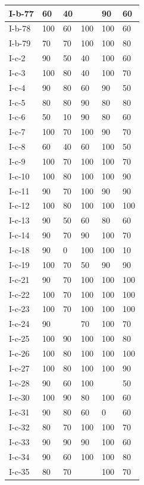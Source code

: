 \documentclass[11pt,a4paper]{article}
\begin{document}
\begin{table}[h]
\begin{tabular}{|l|l|l|l|l|l|}
I-b-77 & 60 & 40 &  & 90 & 60 \\ \hline
I-b-78 & 100 & 60 & 100 & 100 & 60 \\ \hline
I-b-79 & 70 & 70 & 100 & 100 & 80 \\ \hline
I-c-2 & 90 & 50 & 40 & 100 & 60 \\ \hline
I-c-3 & 100 & 80 & 40 & 100 & 70 \\ \hline
I-c-4 & 90 & 80 & 60 & 90 & 50 \\ \hline
I-c-5 & 80 & 80 & 90 & 80 & 80 \\ \hline
I-c-6 & 50 & 10 & 90 & 80 & 60 \\ \hline
I-c-7 & 100 & 70 & 100 & 90 & 70 \\ \hline
I-c-8 & 60 & 40 & 60 & 100 & 50 \\ \hline
I-c-9 & 100 & 70 & 100 & 100 & 70 \\ \hline
I-c-10 & 100 & 80 & 100 & 100 & 90 \\ \hline
I-c-11 & 90 & 70 & 100 & 90 & 90 \\ \hline
I-c-12 & 100 & 80 & 100 & 100 & 100 \\ \hline
I-c-13 & 90 & 50 & 60 & 80 & 60 \\ \hline
I-c-14 & 90 & 70 & 90 & 100 & 70 \\ \hline
I-c-18 & 90 & 0 & 100 & 100 & 10 \\ \hline
I-c-19 & 100 & 70 & 50 & 90 & 90 \\ \hline
I-c-21 & 90 & 70 & 100 & 100 & 100 \\ \hline
I-c-22 & 100 & 70 & 100 & 100 & 100 \\ \hline
I-c-23 & 100 & 70 & 100 & 100 & 100 \\ \hline
I-c-24 & 90 &  & 70 & 100 & 70 \\ \hline
I-c-25 & 100 & 90 & 100 & 100 & 80 \\ \hline
I-c-26 & 100 & 80 & 100 & 100 & 100 \\ \hline
I-c-27 & 100 & 80 & 100 & 100 & 90 \\ \hline
I-c-28 & 90 & 60 & 100 &  & 50 \\ \hline
I-c-30 & 100 & 90 & 80 & 100 & 60 \\ \hline
I-c-31 & 90 & 80 & 60 & 0 & 60 \\ \hline
I-c-32 & 80 & 70 & 100 & 100 & 70 \\ \hline
I-c-33 & 90 & 90 & 90 & 100 & 60 \\ \hline
I-c-34 & 90 & 60 & 100 & 100 & 80 \\ \hline
I-c-35 & 80 & 70 &  & 100 & 70 \\ \hline

\end{tabular}
\end{table}
\end{document}
